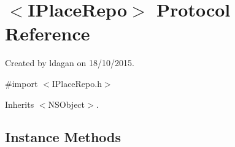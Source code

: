 \hypertarget{protocol_i_place_repo-p}{}\section{$<$I\+Place\+Repo$>$ Protocol Reference}
\label{protocol_i_place_repo-p}


Created by ldagan on 18/10/2015.  




{\ttfamily \#import $<$I\+Place\+Repo.\+h$>$}



Inherits $<$\+N\+S\+Object$>$.

\subsection*{Instance Methods}
